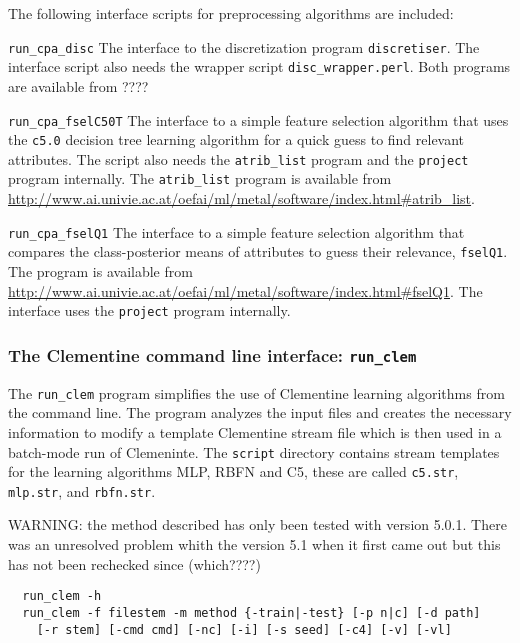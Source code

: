 \documentclass[a4paper,10pt,twoside]{article}
\newenvironment{optionlist}
{\begin{list}{}
    {\setlength{\itemsep}{0em plus0em minus0ex}
      \setlength{\parsep}{0ex}
      \setlength{\topsep}{0em}
      \setlength{\leftmargin}{2em}
      \setlength{\listparindent}{0em}
      \setlength{\itemindent}{-2em}
      \setlength{\partopsep}{0ex}
    }}
  {\end{list}}
\begin{document}
The following interface scripts for preprocessing algorithms are
included:

\begin{optionlist}
\item \verb=run_cpa_disc= The interface to the discretization program
\texttt{discretiser}. The interface script also needs the 
wrapper script \verb=disc_wrapper.perl=. Both programs are available from
????
\item \verb=run_cpa_fselC50T= The interface to a simple feature selection
algorithm that uses the \texttt{c5.0} decision tree learning algorithm
for a quick guess to find relevant attributes. The script also needs the
\texttt{atrib\_list} program  and the \texttt{project} program internally.
The \texttt{atrib\_list} program is available from \url{http://www.ai.univie.ac.at/oefai/ml/metal/software/index.html#atrib_list}.
\item \verb=run_cpa_fselQ1= The interface to a simple feature selection
algorithm that compares the class-posterior means of attributes
to guess their relevance, \texttt{fselQ1}. The program is available from 
\url{http://www.ai.univie.ac.at/oefai/ml/metal/software/index.html#fselQ1}.
The interface uses the \texttt{project} program internally.
\end{optionlist}

\subsubsection{The Clementine command line interface: \texttt{run\_clem}}

The \texttt{run\_clem} program simplifies the use of Clementine
learning algorithms from the command line.
The program analyzes the input files and creates the necessary
information to modify a template Clementine stream file which 
is then used in a batch-mode run of Clemeninte.
The \texttt{script} directory contains stream templates for 
the learning algorithms MLP, RBFN and C5, these are called
\texttt{c5.str}, \texttt{mlp.str}, and \texttt{rbfn.str}.

WARNING: the method described has only been tested with version 5.0.1.
There was an unresolved problem whith the version 5.1 when it first
came out but this has not been rechecked since (which????)

\begin{verbatim}
  run_clem -h 
  run_clem -f filestem -m method {-train|-test} [-p n|c] [-d path] 
    [-r stem] [-cmd cmd] [-nc] [-i] [-s seed] [-c4] [-v] [-vl]
\end{verbatim}
\end{document}

